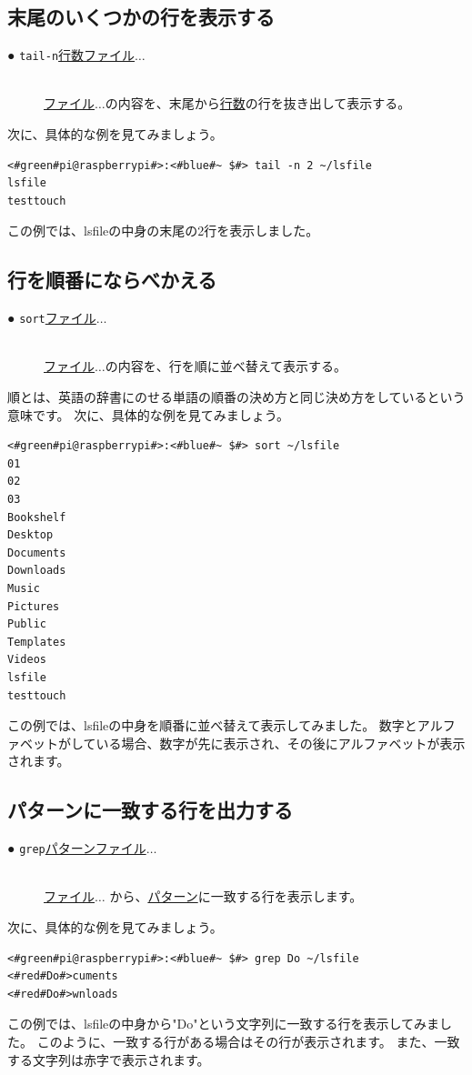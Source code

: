 \documentclass[text03.tex]{subfiles}
\begin{document}
\subsection{末尾のいくつかの行を表示する}
\begin{description}
    \item[● \texttt{tail}\textvisiblespace \texttt{-n}\textvisiblespace \underline{行数}\textvisiblespace \underline{ファイル}$\ldots$ ]\mbox{}\\
    \underline{ファイル}$\ldots$の内容を、末尾から\underline{行数}の行を抜き出して表示する。
\end{description}
次に、具体的な例を見てみましょう。
\begin{lstlisting}[caption=tailコマンドの実行例, label=shuf_example]
<#green#pi@raspberrypi#>:<#blue#~ $#> tail -n 2 ~/lsfile
lsfile
testtouch
\end{lstlisting}
この例では、lsfileの中身の末尾の2行を表示しました。

\subsection{行を順番にならべかえる}
\begin{description}
    \item[● \texttt{sort}\textvisiblespace \underline{ファイル}$\ldots$ ]\mbox{}\\
    \underline{ファイル}$\ldots$の内容を、行を順に並べ替えて表示する。
\end{description}
順とは、英語の辞書にのせる単語の順番の決め方と同じ決め方をしているという意味です。
次に、具体的な例を見てみましょう。
\begin{lstlisting}[caption=sortコマンドの実行例, label=sort_example]
<#green#pi@raspberrypi#>:<#blue#~ $#> sort ~/lsfile
01
02
03
Bookshelf
Desktop
Documents
Downloads
Music
Pictures
Public
Templates
Videos
lsfile
testtouch
\end{lstlisting}
この例では、lsfileの中身を順番に並べ替えて表示してみました。
数字とアルファベットがしている場合、数字が先に表示され、その後にアルファベットが表示されます。

\subsection{パターンに一致する行を出力する}
\begin{description}
    \item[● \texttt{grep}\textvisiblespace \underline{パターン}\textvisiblespace \underline{ファイル}$\ldots$ ]\mbox{}\\
    \underline{ファイル}$\ldots$ から、\underline{パターン}に一致する行を表示します。
\end{description}
次に、具体的な例を見てみましょう。
\begin{lstlisting}[caption=grepコマンドの実行例, label=grep_example]
<#green#pi@raspberrypi#>:<#blue#~ $#> grep Do ~/lsfile
<#red#Do#>cuments
<#red#Do#>wnloads
\end{lstlisting}
この例では、lsfileの中身から"Do"という文字列に一致する行を表示してみました。
このように、一致する行がある場合はその行が表示されます。
また、一致する文字列は赤字で表示されます。
\end{document}
